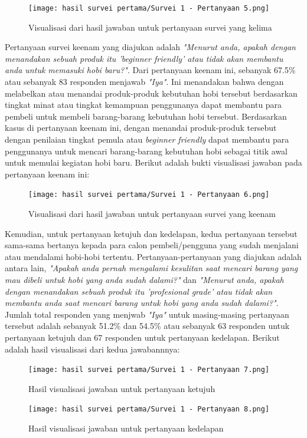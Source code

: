 \documentclass[a4paper]{article}
\begin{document}
\begin{figure}[h]
    \centering
    \texttt{[image: hasil survei pertama/Survei 1 - Pertanyaan 5.png]}
    \caption{Visualisasi dari hasil jawaban untuk pertanyaan survei yang kelima}
\end{figure}

Pertanyaan survei keenam yang diajukan adalah \textit{"Menurut anda, apakah dengan menandakan sebuah produk itu 'beginner friendly' atau tidak akan membantu anda untuk memasuki hobi baru?"}. Dari pertanyaan keenam ini, sebanyak 67.5\% atau sebanyak 83 responden menjawab \textit{"Iya"}. Ini menandakan bahwa dengan melabelkan atau menandai produk-produk kebutuhan hobi tersebut berdasarkan tingkat minat atau tingkat kemampuan penggunanya dapat membantu para pembeli untuk membeli barang-barang kebutuhan hobi tersebut. Berdasarkan kasus di pertanyaan keenam ini, dengan menandai produk-produk tersebut dengan penilaian tingkat pemula atau \textit{beginner friendly} dapat membantu para penggunanya untuk mencari barang-barang kebutuhan hobi sebagai titik awal untuk memulai kegiatan hobi baru. Berikut adalah bukti visualisasi jawaban pada pertanyaan keenam ini:
\begin{figure}[h]
    \centering
    \texttt{[image: hasil survei pertama/Survei 1 - Pertanyaan 6.png]}
    \caption{Visualisasi dari hasil jawaban untuk pertanyaan survei yang keenam}
\end{figure}

Kemudian, untuk pertanyaan ketujuh dan kedelapan, kedua pertanyaan tersebut sama-sama bertanya kepada para calon pembeli/pengguna yang sudah menjalani atau mendalami hobi-hobi tertentu. Pertanyaan-pertanyaan yang diajukan adalah antara lain, \textit{"Apakah anda pernah mengalami kesulitan saat mencari barang yang mau dibeli untuk hobi yang anda sudah dalami?"} dan \textit{"Menurut anda, apakah dengan menandakan sebuah produk itu 'profesional grade' atau tidak akan membantu anda saat mencari barang untuk hobi yang anda sudah dalami?"}. Jumlah total responden yang menjwab \textit{"Iya"} untuk masing-masing pertanyaan tersebut adalah sebanyak 51.2\% dan 54.5\% atau sebanyak 63 responden untuk pertanyaan ketujuh dan 67 responden untuk pertanyaan kedelapan. Berikut adalah hasil visualisasi dari kedua jawabannnya:

\begin{figure}[h]
    \centering
    \texttt{[image: hasil survei pertama/Survei 1 - Pertanyaan 7.png]}
    \caption{Hasil visualisasi jawaban untuk pertanyaan ketujuh}
\end{figure}
\newpage
\begin{figure}[h]
    \centering
    \texttt{[image: hasil survei pertama/Survei 1 - Pertanyaan 8.png]}
    \caption{Hasil visualisasi jawaban untuk pertanyaan kedelapan}
\end{figure}
\end{document}
